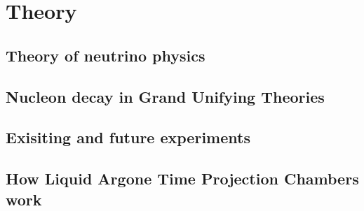 
\chapter{Theory}  %

\graphicspath{{Theory/Figs/Raster/}{Theory/Figs/PDF/}{Theory/Figs/Vector/}}

\section{Theory of neutrino physics} %

\section{Nucleon decay in Grand Unifying Theories}  %

\section{Exisiting and future experiments} %

\section{How Liquid Argone Time Projection Chambers work} %
